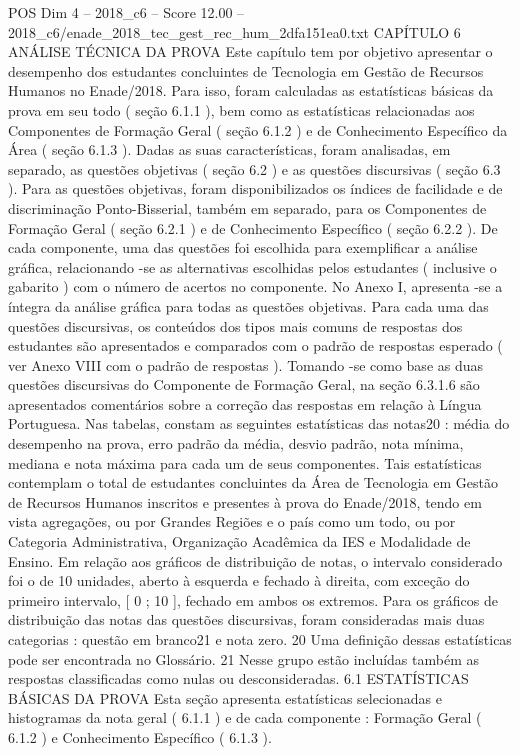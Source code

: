 \begin{textsample}{POS Dim 4 – 2018\_c6 – Score 12.00 – 2018\_c6/enade\_2018\_tec\_gest\_rec\_hum\_2dfa151ea0.txt}  \label{ex:f4_pos_016}
CAPÍTULO 6 ANÁLISE TÉCNICA DA PROVA Este capítulo tem por objetivo apresentar o desempenho dos estudantes concluintes de Tecnologia em Gestão de Recursos Humanos no Enade/2018.
Para isso, foram calculadas as estatísticas básicas da prova em seu todo ( seção 6.1.1 ), bem como as estatísticas relacionadas aos Componentes de Formação Geral ( seção 6.1.2 ) e de Conhecimento Específico da Área ( seção 6.1.3 ).
Dadas as suas características, foram analisadas, em separado, as questões objetivas ( seção 6.2 ) e as questões discursivas ( seção 6.3 ).
Para as questões objetivas, foram disponibilizados os índices de facilidade e de discriminação Ponto-Bisserial, também em separado, para os Componentes de Formação Geral ( seção 6.2.1 ) e de Conhecimento Específico ( seção 6.2.2 ).
De cada componente, uma das questões foi escolhida para exemplificar a análise gráfica, relacionando -se as alternativas escolhidas pelos estudantes ( inclusive o gabarito ) com o número de acertos no componente.
No Anexo I, apresenta -se a íntegra da análise gráfica para todas as questões objetivas.
Para cada uma das questões discursivas, os conteúdos dos tipos mais comuns de respostas dos estudantes são apresentados e comparados com o padrão de respostas esperado ( ver Anexo VIII com o padrão de respostas ).
Tomando -se como base as duas questões discursivas do Componente de Formação Geral, na seção 6.3.1.6 são apresentados comentários sobre a correção das respostas em relação à Língua Portuguesa.
Nas tabelas, constam as seguintes estatísticas das notas20 : média do desempenho na prova, erro padrão da média, desvio padrão, nota mínima, mediana e nota máxima para cada um de seus componentes.
Tais estatísticas contemplam o total de estudantes concluintes da Área de Tecnologia em Gestão de Recursos Humanos inscritos e presentes à prova do Enade/2018, tendo em vista agregações, ou por Grandes Regiões e o país como um todo, ou por Categoria Administrativa, Organização Acadêmica da IES e Modalidade de Ensino.
Em relação aos gráficos de distribuição de notas, o intervalo considerado foi o de 10 unidades, aberto à esquerda e fechado à direita, com exceção do primeiro intervalo, [ 0 ; 10 ], fechado em ambos os extremos.
Para os gráficos de distribuição das notas das questões discursivas, foram consideradas mais duas categorias : questão em branco21 e nota zero. 20 Uma definição dessas estatísticas pode ser encontrada no Glossário. 21 Nesse grupo estão incluídas também as respostas classificadas como nulas ou desconsideradas. 6.1 ESTATÍSTICAS BÁSICAS DA PROVA Esta seção apresenta estatísticas selecionadas e histogramas da nota geral ( 6.1.1 ) e de cada componente : Formação Geral ( 6.1.2 ) e Conhecimento Específico ( 6.1.3 ).

\end{textsample}
